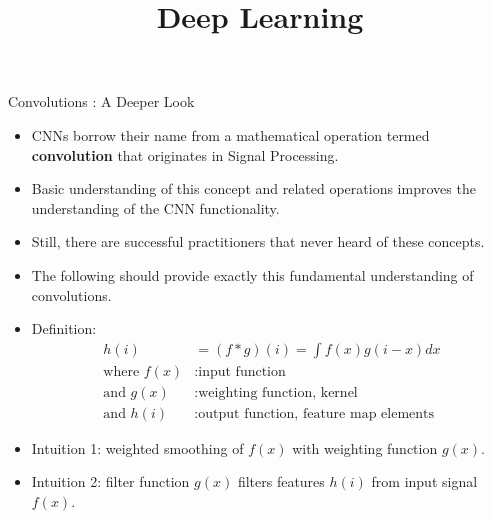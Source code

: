 




\newcommand{\titlefigure}{plots/xcorrel_animations/conv_xcorrel.png}
\newcommand{\learninggoals}{
  \item Convolution vs. Cross-Correlation
}

\title{Deep Learning}
\date{}






\begin{vbframe}{Convolutions : A Deeper Look}
    \begin{itemize}
        \item CNNs borrow their name from a mathematical operation termed \textbf{convolution} that originates in Signal Processing.
        \item Basic understanding of this concept and related operations improves the understanding of the CNN functionality.
        \item Still, there are successful practitioners that never heard of these concepts.
        \item The following should provide exactly this fundamental understanding of convolutions.
    \end{itemize}
\framebreak
    \begin{itemize}
        \item Definition: \\
            \begin{equation*}
                \begin{split}
                    h(i) &= (f \ast g)(i) = \int f(x)g(i-x)dx \\
                    \text{where } f(x)&: \text{input function} \\
                    \text{and } g(x)&: \text{weighting function, kernel} \\
                    \text{and } h(i)&: \text{output function, feature map elements}
                \end{split}
            \end{equation*}
        \item Intuition 1: weighted smoothing of $f(x)$ with weighting function $g(x)$. 
        \item Intuition 2: filter function $g(x)$ filters features $h(i)$ from input signal $f(x)$.
    \end{itemize}
\end{vbframe}    

